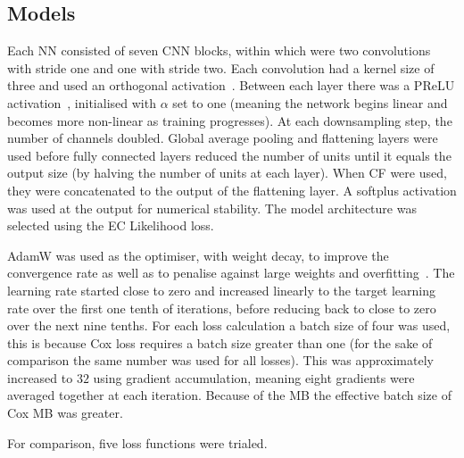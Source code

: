         \subsection{Models} \label{sec:deep_learning_for_ct_based_survival_analysis_of_idiopathic_pulmonary_fibrosis_patients_appendix_methods_models}
            Each \gls{NN} consisted of seven \gls{CNN} blocks, within which were two convolutions with stride one and one with stride two. Each convolution had a kernel size of three and used an orthogonal activation~\parencite{Hu2020ProvableNetworks}. Between each layer there was a \gls{PReLU} activation~\parencite{He2015DelvingClassification}, initialised with $\alpha$ set to one (meaning the network begins linear and becomes more non-linear as training progresses). At each downsampling step, the number of channels doubled. Global average pooling and flattening layers were used before fully connected layers reduced the number of units until it equals the output size (by halving the number of units at each layer). When \gls{CF} were used, they were concatenated to the output of the flattening layer. A softplus activation was used at the output for numerical stability. The model architecture was selected using the \gls{EC} Likelihood loss.
    
            AdamW was used as the optimiser, with weight decay, to improve the convergence rate as well as to penalise against large weights and overfitting~\parencite{Loshchilov2019DecoupledRegularization}. The learning rate started close to zero and increased linearly to the target learning rate over the first one tenth of iterations, before reducing back to close to zero over the next nine tenths. For each loss calculation a batch size of four was used, this is because Cox loss requires a batch size greater than one (for the sake of comparison the same number was used for all losses). This was approximately increased to $32$ using gradient accumulation, meaning eight gradients were averaged together at each iteration. Because of the \gls{MB} the effective batch size of Cox \gls{MB} was greater.
    
            For comparison, five loss functions were trialed.
    

